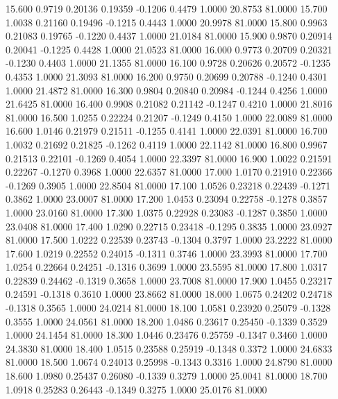   15.600   0.9719   0.20136   0.19359  -0.1206   0.4479   1.0000  20.8753  81.0000
  15.700   1.0038   0.21160   0.19496  -0.1215   0.4443   1.0000  20.9978  81.0000
  15.800   0.9963   0.21083   0.19765  -0.1220   0.4437   1.0000  21.0184  81.0000
  15.900   0.9870   0.20914   0.20041  -0.1225   0.4428   1.0000  21.0523  81.0000
  16.000   0.9773   0.20709   0.20321  -0.1230   0.4403   1.0000  21.1355  81.0000
  16.100   0.9728   0.20626   0.20572  -0.1235   0.4353   1.0000  21.3093  81.0000
  16.200   0.9750   0.20699   0.20788  -0.1240   0.4301   1.0000  21.4872  81.0000
  16.300   0.9804   0.20840   0.20984  -0.1244   0.4256   1.0000  21.6425  81.0000
  16.400   0.9908   0.21082   0.21142  -0.1247   0.4210   1.0000  21.8016  81.0000
  16.500   1.0255   0.22224   0.21207  -0.1249   0.4150   1.0000  22.0089  81.0000
  16.600   1.0146   0.21979   0.21511  -0.1255   0.4141   1.0000  22.0391  81.0000
  16.700   1.0032   0.21692   0.21825  -0.1262   0.4119   1.0000  22.1142  81.0000
  16.800   0.9967   0.21513   0.22101  -0.1269   0.4054   1.0000  22.3397  81.0000
  16.900   1.0022   0.21591   0.22267  -0.1270   0.3968   1.0000  22.6357  81.0000
  17.000   1.0170   0.21910   0.22366  -0.1269   0.3905   1.0000  22.8504  81.0000
  17.100   1.0526   0.23218   0.22439  -0.1271   0.3862   1.0000  23.0007  81.0000
  17.200   1.0453   0.23094   0.22758  -0.1278   0.3857   1.0000  23.0160  81.0000
  17.300   1.0375   0.22928   0.23083  -0.1287   0.3850   1.0000  23.0408  81.0000
  17.400   1.0290   0.22715   0.23418  -0.1295   0.3835   1.0000  23.0927  81.0000
  17.500   1.0222   0.22539   0.23743  -0.1304   0.3797   1.0000  23.2222  81.0000
  17.600   1.0219   0.22552   0.24015  -0.1311   0.3746   1.0000  23.3993  81.0000
  17.700   1.0254   0.22664   0.24251  -0.1316   0.3699   1.0000  23.5595  81.0000
  17.800   1.0317   0.22839   0.24462  -0.1319   0.3658   1.0000  23.7008  81.0000
  17.900   1.0455   0.23217   0.24591  -0.1318   0.3610   1.0000  23.8662  81.0000
  18.000   1.0675   0.24202   0.24718  -0.1318   0.3565   1.0000  24.0214  81.0000
  18.100   1.0581   0.23920   0.25079  -0.1328   0.3555   1.0000  24.0561  81.0000
  18.200   1.0486   0.23617   0.25450  -0.1339   0.3529   1.0000  24.1454  81.0000
  18.300   1.0446   0.23476   0.25759  -0.1347   0.3460   1.0000  24.3830  81.0000
  18.400   1.0515   0.23588   0.25919  -0.1348   0.3372   1.0000  24.6833  81.0000
  18.500   1.0674   0.24013   0.25998  -0.1343   0.3316   1.0000  24.8790  81.0000
  18.600   1.0980   0.25437   0.26080  -0.1339   0.3279   1.0000  25.0041  81.0000
  18.700   1.0918   0.25283   0.26443  -0.1349   0.3275   1.0000  25.0176  81.0000
